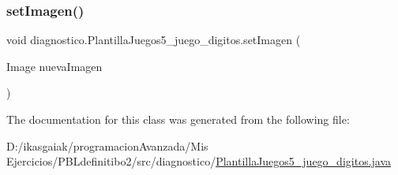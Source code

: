 \subsubsection{\texorpdfstring{set\+Imagen()}{setImagen()}}
{\footnotesize\ttfamily void diagnostico.\+Plantilla\+Juegos5\+\_\+juego\+\_\+digitos.\+set\+Imagen (\begin{DoxyParamCaption}\item[{Image}]{nueva\+Imagen }\end{DoxyParamCaption})}



The documentation for this class was generated from the following file\+:\begin{DoxyCompactItemize}
\item 
D\+:/ikasgaiak/programacion\+Avanzada/\+Mis Ejercicios/\+P\+B\+Ldefinitibo2/src/diagnostico/\mbox{\hyperlink{_plantilla_juegos5__juego__digitos_8java}{Plantilla\+Juegos5\+\_\+juego\+\_\+digitos.\+java}}\end{DoxyCompactItemize}
